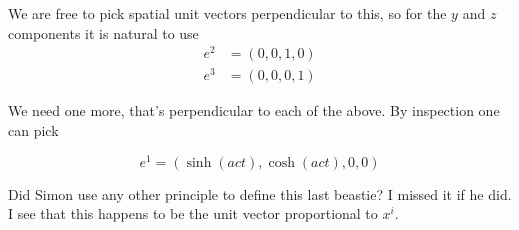 We are free to pick spatial unit vectors perpendicular to this, so for the $y$ and $z$ components it is natural to use
\begin{align*}
e^2 &= ( 0, 0, 1, 0 ) \\
e^3 &= ( 0, 0, 0, 1 )
\end{align*}

We need one more, that's perpendicular to each of the above.  By inspection one can pick

\begin{equation*}
e^1 = ( \sinh( a c t ), \cosh( a c t), 0, 0) 
\end{equation*}

Did Simon use any other principle to define this last beastie?  I missed it if he did.  I see that this happens to be the unit vector proportional to $x^i$.



\EndArticle
